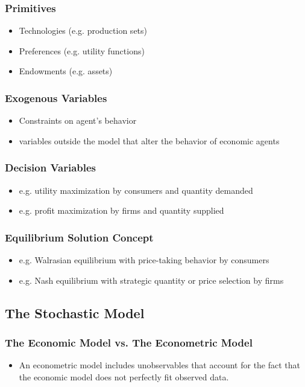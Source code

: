\documentclass{beamer}
\begin{document}
\begin{frame}
\frametitle{Primitives}
\begin{itemize}
\item Technologies (e.g. production sets)
\item Preferences (e.g. utility functions)
\item Endowments (e.g. assets)\footnotemark
{}
\end{itemize}
\end{frame}

\begin{frame}
\frametitle{Exogenous Variables}
\begin{itemize}
\item Constraints on agent's behavior
\item variables outside the model that alter the behavior of economic agents
\end{itemize}
\end{frame}

\begin{frame}
\frametitle{Decision Variables}
\begin{itemize}
\item e.g. utility maximization by consumers and quantity demanded
\item e.g. profit maximization by firms and quantity supplied
\end{itemize}
\end{frame}

\begin{frame}
\frametitle{Equilibrium Solution Concept}
\begin{itemize}
\item e.g. Walrasian equilibrium with price-taking behavior by consumers
\item e.g. Nash equilibrium with strategic quantity or price selection by firms
\end{itemize}
\end{frame}

\subsection{The Stochastic Model}
\begin{frame}
\frametitle{The Economic Model vs. The Econometric Model}
\begin{itemize}
\item An econometric model includes unobservables that account for the fact that the economic model does not perfectly fit observed data.
\end{itemize}
\end{frame}
\end{document}
